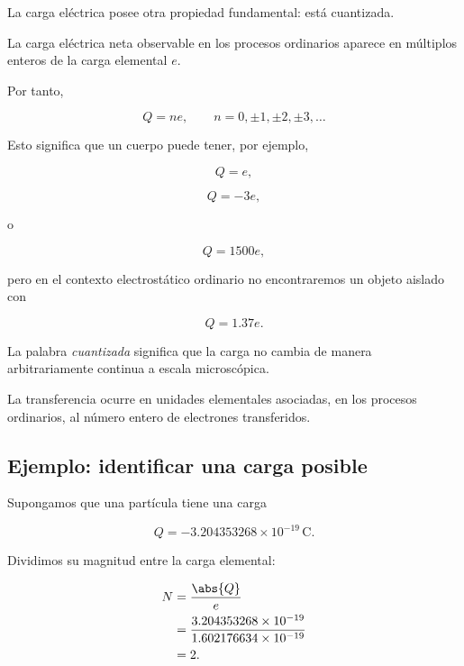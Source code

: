 La carga eléctrica posee otra propiedad fundamental: está cuantizada.

\begin{principio}
La carga eléctrica neta observable en los procesos ordinarios aparece en
múltiplos enteros de la carga elemental \(e\).
\end{principio}

Por tanto,

\begin{equation}
    \boxed{
    Q=ne
    },
    \qquad
    n=0,\pm1,\pm2,\pm3,\ldots
    \label{eq:cuantizacion_carga}
\end{equation}

Esto significa que un cuerpo puede tener, por ejemplo,

\[
Q=e,
\]

\[
Q=-3e,
\]

o

\[
Q=1500e,
\]

pero en el contexto electrostático ordinario no encontraremos un objeto
aislado con

\[
Q=1.37e.
\]

\begin{interpretacion}
La palabra \textit{cuantizada} significa que la carga no cambia de manera
arbitrariamente continua a escala microscópica.

La transferencia ocurre en unidades elementales asociadas, en los procesos
ordinarios, al número entero de electrones transferidos.
\end{interpretacion}



\subsection{Ejemplo: identificar una carga posible}

Supongamos que una partícula tiene una carga

\[
Q=-3.204353268\times10^{-19}\,\si{\coulomb}.
\]

Dividimos su magnitud entre la carga elemental:

\begin{align}
    N
    &=
    \frac{\abs{Q}}{e}
    \\
    &=
    \frac{3.204353268\times10^{-19}}
    {1.602176634\times10^{-19}}
    \\
    &=2.
\end{align}

